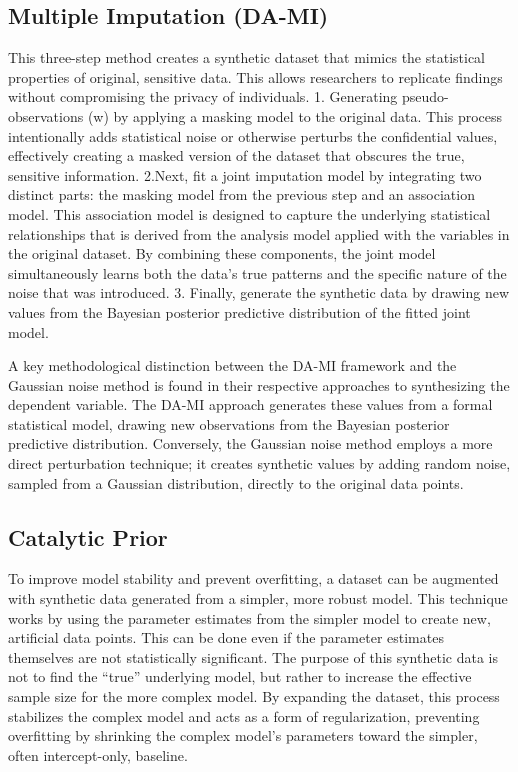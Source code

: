 \documentclass[sn-basic,pdflatex]{sn-jnl}
\theoremstyle{remark}
\theoremstyle{definition}
\begin{document}
\subsection{Multiple Imputation (DA-MI)}\label{subsec2-6}

This three-step method creates a synthetic dataset that mimics the
statistical properties of original, sensitive data. This allows
researchers to replicate findings without compromising the privacy of
individuals. 1. Generating pseudo-observations (w) by applying a masking
model to the original data. This process intentionally adds statistical
noise or otherwise perturbs the confidential values, effectively
creating a masked version of the dataset that obscures the true,
sensitive information. 2.Next, fit a joint imputation model by
integrating two distinct parts: the masking model from the previous step
and an association model. This association model is designed to capture
the underlying statistical relationships that is derived from the
analysis model applied with the variables in the original dataset. By
combining these components, the joint model simultaneously learns both
the data's true patterns and the specific nature of the noise that was
introduced. 3. Finally, generate the synthetic data by drawing new
values from the Bayesian posterior predictive distribution of the fitted
joint model.

A key methodological distinction between the DA-MI framework and the
Gaussian noise method is found in their respective approaches to
synthesizing the dependent variable. The DA-MI approach generates these
values from a formal statistical model, drawing new observations from
the Bayesian posterior predictive distribution. Conversely, the Gaussian
noise method employs a more direct perturbation technique; it creates
synthetic values by adding random noise, sampled from a Gaussian
distribution, directly to the original data points.

\subsection{Catalytic Prior}\label{subsec2-7}

To improve model stability and prevent overfitting, a dataset can be
augmented with synthetic data generated from a simpler, more robust
model. This technique works by using the parameter estimates from the
simpler model to create new, artificial data points. This can be done
even if the parameter estimates themselves are not statistically
significant. The purpose of this synthetic data is not to find the
``true'' underlying model, but rather to increase the effective sample
size for the more complex model. By expanding the dataset, this process
stabilizes the complex model and acts as a form of regularization,
preventing overfitting by shrinking the complex model's parameters
toward the simpler, often intercept-only, baseline.
\end{document}
